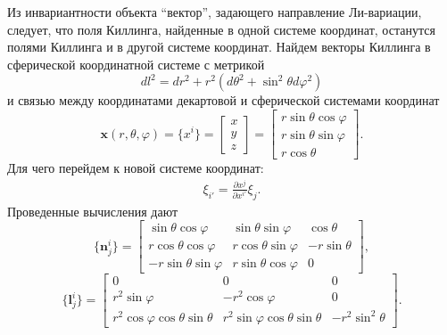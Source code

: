 \documentclass[12pt,a4paper]{article}
\newcommand{\V}[1]{\mathbf{#1}}
\begin{document}
        Из инвариантности объекта \enquote{вектор}, задающего направление Ли-вариации, следует, что поля Киллинга, найденные в одной системе координат, останутся полями Киллинга и в другой системе координат. Найдем векторы Киллинга в сферической координатной системе с метрикой
        \begin{equation}
            dl^2 = dr^2 + r^2 (d\theta^2 + \sin ^2 \theta d\varphi^2)
        \end{equation}
        и связью между координатами декартовой и сферической системами координат
        \begin{equation}
            \V{x}(r, \theta, \varphi)
            =
            \{x^i\}
            =
            \begin{bmatrix}
                x \\ y \\ z
            \end{bmatrix}
            =
            \begin{bmatrix}
                r \sin\theta \cos\varphi \\
                r \sin\theta \sin\varphi \\
                r \cos\theta
            \end{bmatrix}
            .
        \end{equation}
        Для чего перейдем к новой системе координат:
        \begin{equation}\begin{aligned}
            \xi_{i'} = \frac{\partial x^j}{\partial x^{i'}} \xi_j.
        \end{aligned}\end{equation}
        Проведенные вычисления дают
        \begin{equation}
            \{\V{n}^i_j\}
            =
            \begin{bmatrix}
                \sin\theta \cos\varphi     & \sin\theta \sin\varphi   & \cos\theta \\
                r \cos\theta \cos\varphi   & r \cos\theta \sin\varphi & - r \sin\theta \\
                - r \sin\theta \sin\varphi & r \sin\theta \cos\varphi & 0
            \end{bmatrix}
            ,
        \end{equation}
        \begin{equation}
            \{\V{l}^i_j\}
            =
            \begin{bmatrix}
                0
                    & 0
                    & 0 \\
                r^2 \sin\varphi
                    & - r^2 \cos\varphi
                    & 0 \\
                r^2 \cos\varphi \cos\theta \sin\theta
                    & r^2 \sin\varphi \cos\theta \sin\theta
                    & - r^2 \sin^2\theta
            \end{bmatrix}
            .
        \end{equation}
\end{document}
